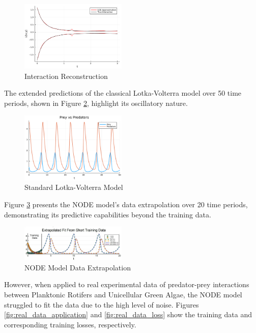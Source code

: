 \documentclass[twocolumn]{article}
\begin{document}
\begin{figure}[h]
    \centering
    \includegraphics[width=0.45\textwidth]{plots/Ideal_Data__missingterm_reconstruction.pdf}
    \caption{Interaction Reconstruction}
    \label{fig:interaction_reconstruction}
\end{figure}

\FloatBarrier

The extended predictions of the classical Lotka-Volterra model over 50 time periods, shown in Figure \ref{fig:lotka_volterra_predictions}, highlight its oscillatory nature.

\begin{figure}[h]
    \centering
    \includegraphics[width=0.45\textwidth]{plots/algae_vs_predators.pdf}
    \caption{Standard Lotka-Volterra Model}
    \label{fig:lotka_volterra_predictions}
\end{figure}

Figure \ref{fig:node_extrapolation} presents the NODE model's data extrapolation over 20 time periods, demonstrating its predictive capabilities beyond the training data.

\begin{figure}[h]
    \centering
    \includegraphics[width=0.45\textwidth]{plots/Extrapolated_fit.png}
    \caption{NODE Model Data Extrapolation}
    \label{fig:node_extrapolation}
\end{figure}

However, when applied to real experimental data of predator-prey interactions between Planktonic Rotifers and Unicellular Green Algae, the NODE model struggled to fit the data due to the high level of noise. Figures \ref{fig:real_data_application} and \ref{fig:real_data_loss} show the training data  and corresponding training losses, respectively.
\end{document}
